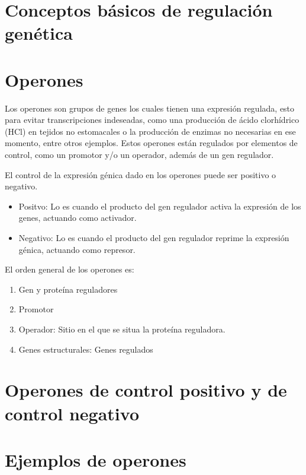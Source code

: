 


\section{Conceptos básicos de regulación genética}


\section{Operones}

Los operones son grupos de genes los cuales tienen una expresión regulada, esto para evitar transcripciones indeseadas, como una producción de ácido clorhídrico (HCl) en tejidos no estomacales o la producción de enzimas no necesarias en ese momento, entre otros ejemplos. Estos operones están regulados por elementos de control, como un promotor y/o un operador, además de un gen regulador.

El control de la expresión génica dado en los operones puede ser positivo o negativo.

\begin{itemize}
    \item Positvo: Lo es cuando el producto del gen regulador activa la expresión de los genes, actuando como activador.
    \item Negativo: Lo es cuando el producto del gen regulador reprime la expresión génica, actuando como represor.
\end{itemize}

El orden general de los operones es:

\begin{enumerate}
    \item Gen y proteína reguladores
    \item Promotor
    \item Operador: Sitio en el que se situa la proteína reguladora.
    \item Genes estructurales: Genes regulados
\end{enumerate}

\section{Operones de control positivo y de control negativo}



\section{Ejemplos de operones}

